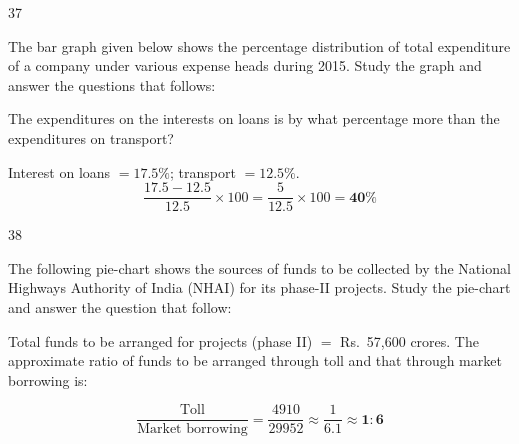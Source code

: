 \begin{question}{37}
{The bar graph given below shows the percentage distribution of total expenditure of a company under various expense heads during 2015. Study the graph and answer the questions that follows:\par}
The expenditures on the interests on loans is by what percentage more than the expenditures on transport?
\begin{explain}
Interest on loans $=17.5\%$; transport $=12.5\%$.
\[\frac{17.5-12.5}{12.5}\times100=\frac{5}{12.5}\times100=\mathbf{40\%}\]
\end{explain}
\end{question}

\begin{question}{38}
{The following pie-chart shows the sources of funds to be collected by the National Highways Authority of India (NHAI) for its phase-II projects. Study the pie-chart and answer the question that follow:\par}
Total funds to be arranged for projects (phase II) $=$ Rs.~57,600 crores. The approximate ratio of funds to be arranged through toll and that through market borrowing is:
\begin{explain}
\[\frac{\text{Toll}}{\text{Market borrowing}}=\frac{4910}{29952}\approx\frac{1}{6.1}\approx\mathbf{1:6}\]
\end{explain}
\end{question}

